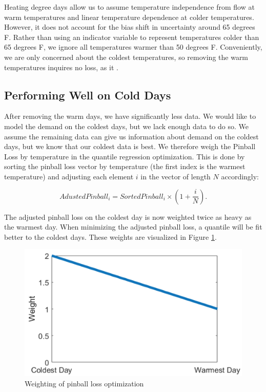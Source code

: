 \documentclass{article}
\begin{document}
Heating degree days allow us to assume temperature independence from flow at warm temperatures and linear temperature dependence at colder temperatures. However, it does not account for the bias shift in uncertainty around 65 degrees F. Rather than using an indicator variable to represent temperatures colder than 65 degrees F, we ignore all temperatures warmer than 50 degrees F. Conveniently, we are only concerned about the coldest temperatures, so removing the warm temperatures inquires no loss, as it .

\subsection{Performing Well on Cold Days}

After removing the warm days, we have significantly less data. We would like to model the demand on the coldest days, but we lack enough data to do so. We assume the remaining data can give us information about demand on the coldest days, but we know that our coldest data is best. We therefore weigh the Pinball Loss by temperature in the quantile regression optimization. This is done by sorting the pinball loss vector by temperature (the first index is the warmest temperature) and adjusting each element $i$ in the vector of length $N$ accordingly:

\begin{equation}
    AdustedPinball_i = SortedPinball_i \times (1 + \frac{i}{N}).
\end{equation}

The adjusted pinball loss on the coldest day is now weighted twice as heavy as the warmest day. When minimizing the adjusted pinball loss, a quantile will be fit better to the coldest days. These weights are visualized in Figure \ref{fig:weighting}.

\begin{figure} \label{fig:weighting}
	\centering
	\includegraphics[scale=0.4]{weighting.png}
	\caption{Weighting of pinball loss optimization}
\end{figure}
\end{document}
